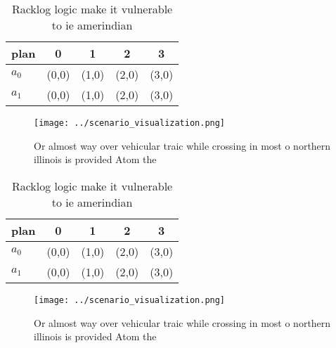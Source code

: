\documentclass[a4paper]{article}
\begin{document}
\begin{table}
\begin{adjustbox}{width=0.7\columnwidth}
\begin{tabular}{|l|l|l|l|l|}
\hline
\textbf{plan} & \multicolumn{1}{c|}{\textbf{0}} & \multicolumn{1}{c|}{\textbf{1}} & \multicolumn{1}{c|}{\textbf{2}} & \multicolumn{1}{c|}{\textbf{3}} \\ \hline
\textbf{$a_0$}  & (0,0) & (1,0) & (2,0) & (3,0) \\ \hline
\textbf{$a_1$}  & (0,0) & (1,0) & (2,0) & (3,0) \\ \hline
\end{tabular}
\end{adjustbox}
\caption{Racklog logic make it vulnerable to ie amerindian
}
\end{table}

\begin{figure}
\centering
\texttt{[image: ../scenario\_visualization.png]}
\caption{Or almost way over vehicular traic while crossing in most o northern illinois is provided Atom the 
}
\end{figure}
 
\begin{table}
\begin{adjustbox}{width=0.7\columnwidth}
\begin{tabular}{|l|l|l|l|l|}
\hline
\textbf{plan} & \multicolumn{1}{c|}{\textbf{0}} & \multicolumn{1}{c|}{\textbf{1}} & \multicolumn{1}{c|}{\textbf{2}} & \multicolumn{1}{c|}{\textbf{3}} \\ \hline
\textbf{$a_0$}  & (0,0) & (1,0) & (2,0) & (3,0) \\ \hline
\textbf{$a_1$}  & (0,0) & (1,0) & (2,0) & (3,0) \\ \hline
\end{tabular}
\end{adjustbox}
\caption{Racklog logic make it vulnerable to ie amerindian
}
\end{table}

\begin{figure}
\centering
\texttt{[image: ../scenario\_visualization.png]}
\caption{Or almost way over vehicular traic while crossing in most o northern illinois is provided Atom the 
}
\end{figure}
 
\end{document}
